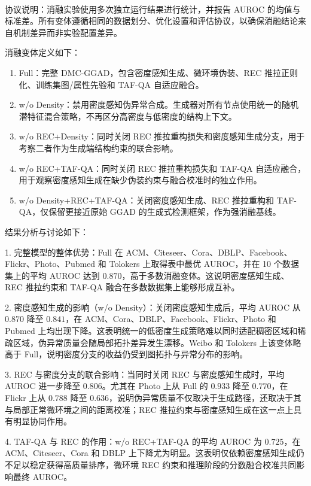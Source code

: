 ﻿﻿﻿﻿    \documentclass[conference, onecolumn]{IEEEtran}
\begin{document}
\noindent\small 协议说明：消融实验使用多次独立运行结果进行统计，并报告 AUROC 的均值与标准差。所有变体遵循相同的数据划分、优化设置和评估协议，以确保消融结论来自机制差异而非实验配置差异。

\noindent 消融变体定义如下：
\begin{enumerate}
    \item Full：完整 DMC-GGAD，包含密度感知生成、微环境伪装、REC 推拉正则化、训练集图/属性先验和 TAF-QA 自适应融合。
    \item w/o Density：禁用密度感知伪异常合成。生成器对所有节点使用统一的随机潜特征混合策略，不再区分高密度与低密度的结构上下文。
    \item w/o REC+Density：同时关闭 REC 推拉重构损失和密度感知生成分支，用于考察二者作为生成端结构约束的联合影响。
    \item w/o REC+TAF-QA：同时关闭 REC 推拉重构损失和 TAF-QA 自适应融合，用于观察密度感知生成在缺少伪装约束与融合校准时的独立作用。
    \item w/o Density+REC+TAF-QA：关闭密度感知生成、REC 推拉重构和 TAF-QA，仅保留更接近原始 GGAD 的生成式检测框架，作为强消融基线。
\end{enumerate}

\noindent 结果分析与讨论如下：

1. 完整模型的整体优势：Full 在 ACM、Citeseer、Cora、DBLP、Facebook、Flickr、Photo、Pubmed 和 Tolokers 上取得表中最优 AUROC，并在 10 个数据集上的平均 AUROC 达到 $0.870$，高于多数消融变体。这说明密度感知生成、REC 推拉约束和 TAF-QA 融合在多数数据集上能够形成互补。

2. 密度感知生成的影响（w/o Density）：关闭密度感知生成后，平均 AUROC 从 $0.870$ 降至 $0.841$，在 ACM、Cora、DBLP、Facebook、Flickr、Photo 和 Pubmed 上均出现下降。这表明统一的低密度生成策略难以同时适配稠密区域和稀疏区域，伪异常质量会随局部拓扑差异发生漂移。Weibo 和 Tolokers 上该变体略高于 Full，说明密度分支的收益仍受到图拓扑与异常分布的影响。

3. REC 与密度分支的联合影响：当同时关闭 REC 与密度感知生成时，平均 AUROC 进一步降至 $0.806$。尤其在 Photo 上从 Full 的 $0.933$ 降至 $0.770$，在 Flickr 上从 $0.788$ 降至 $0.636$，说明伪异常质量不仅取决于生成路径，还取决于其与局部正常微环境之间的距离校准；REC 推拉约束与密度感知生成在这一点上具有明显协同作用。

4. TAF-QA 与 REC 的作用：w/o REC+TAF-QA 的平均 AUROC 为 $0.725$，在 ACM、Citeseer、Cora 和 DBLP 上下降尤为明显。这表明仅依赖密度感知生成仍不足以稳定获得高质量排序，微环境 REC 约束和推理阶段的分数融合校准共同影响最终 AUROC。
\end{document}
